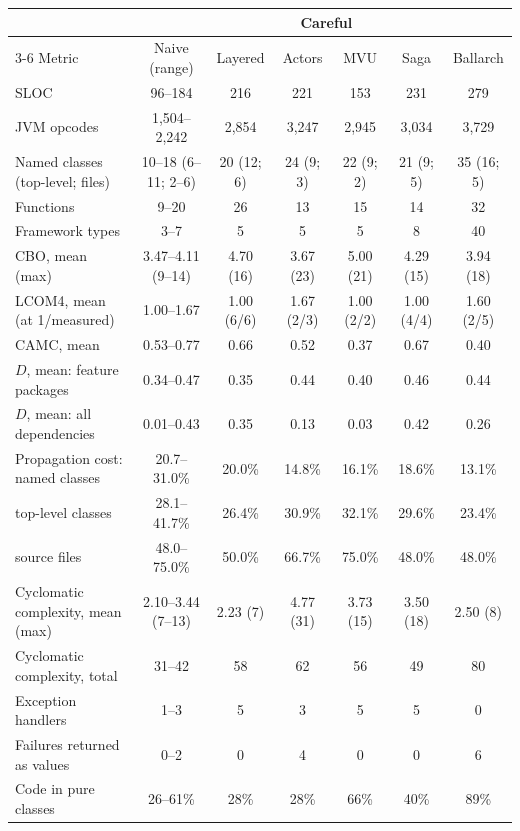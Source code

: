 \documentclass[11pt]{article}
\theoremstyle{definition}
\theoremstyle{plain}
\begin{document}
\begin{table}[t]
\centering\footnotesize
\setlength{\tabcolsep}{3.5pt}
\begin{tabular}{@{}lcccccc@{}}
\toprule
& & \multicolumn{4}{c}{Careful} & \\
\cmidrule(lr){3-6}
Metric & Naive (range) & Layered & Actors & MVU & Saga & Ballarch \\
\midrule
SLOC & 96--184 & 216 & 221 & 153 & 231 & 279 \\
JVM opcodes & 1{,}504--2{,}242 & 2{,}854 & 3{,}247 & 2{,}945 & 3{,}034 & 3{,}729 \\
Named classes (top-level; files) & 10--18 (6--11; 2--6) & 20 (12; 6) & 24 (9; 3) & 22 (9; 2) & 21 (9; 5) & 35 (16; 5) \\
Functions & 9--20 & 26 & 13 & 15 & 14 & 32 \\
Framework types & 3--7 & 5 & 5 & 5 & 8 & 40 \\
CBO, mean (max) & 3.47--4.11 (9--14) & 4.70 (16) & 3.67 (23) & 5.00 (21) & 4.29 (15) & 3.94 (18) \\
LCOM4, mean (at 1/measured) & 1.00--1.67 & 1.00 (6/6) & 1.67 (2/3) & 1.00 (2/2) & 1.00 (4/4) & 1.60 (2/5) \\
CAMC, mean & 0.53--0.77 & 0.66 & 0.52 & 0.37 & 0.67 & 0.40 \\
$D$, mean: feature packages & 0.34--0.47 & 0.35 & 0.44 & 0.40 & 0.46 & 0.44 \\
$D$, mean: all dependencies & 0.01--0.43 & 0.35 & 0.13 & 0.03 & 0.42 & 0.26 \\
Propagation cost: named classes & 20.7--31.0\% & 20.0\% & 14.8\% & 16.1\% & 18.6\% & 13.1\% \\
\quad top-level classes & 28.1--41.7\% & 26.4\% & 30.9\% & 32.1\% & 29.6\% & 23.4\% \\
\quad source files & 48.0--75.0\% & 50.0\% & 66.7\% & 75.0\% & 48.0\% & 48.0\% \\
Cyclomatic complexity, mean (max) & 2.10--3.44 (7--13) & 2.23 (7) & 4.77 (31) & 3.73 (15) & 3.50 (18) & 2.50 (8) \\
Cyclomatic complexity, total & 31--42 & 58 & 62 & 56 & 49 & 80 \\
Exception handlers & 1--3 & 5 & 3 & 5 & 5 & 0 \\
Failures returned as values & 0--2 & 0 & 4 & 0 & 0 & 6 \\
Code in pure classes & 26--61\% & 28\% & 28\% & 66\% & 40\% & 89\% \\
\bottomrule
\end{tabular}

\end{table}
\end{document}
